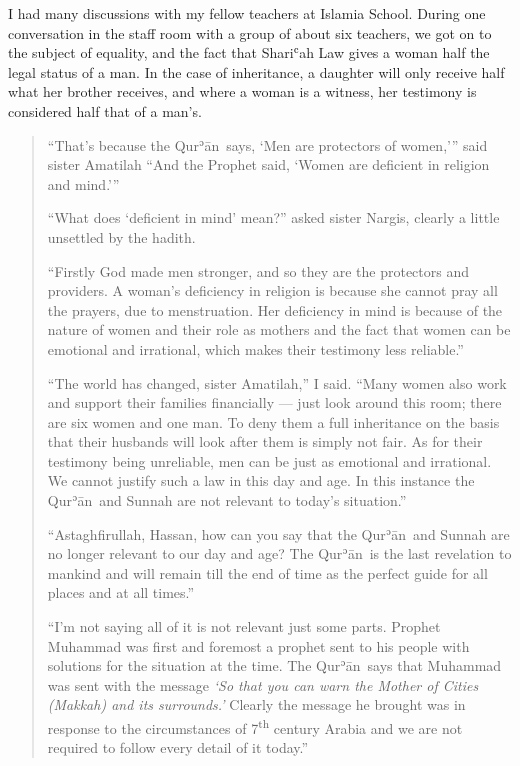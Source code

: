 \documentclass[12pt]{memoir}
\def\´{ʾ} %
\def\`{ʿ} %
\let \Sup=\textsuperscript
\newcommand{\cor}[2]{#2} %
\def \Quran{Qur\-\´ān} %
\begin{document}
I had many discussions with my fellow teachers at Islamia School.
During one conversation in the staff room with a group of about six teachers,
we got on to the subject of equality,
and the fact that Shari\`ah Law gives a woman half the legal status of a man.
In the case of inheritance, a daughter will only receive half
what her brother receives, and where a woman is a witness,
her testimony is considered half that of a man’s.

\begin{quote}
“That’s because the \Quran\ says, ‘Men are protectors of women,’”
said sister Amatilah
“And the Prophet said, ‘Women are deficient in religion and mind.’”

“What does ‘deficient in mind’ mean?” asked sister Nargis,
clearly a little unsettled by the hadith.

“Firstly God made men stronger, and so they are the protectors and providers.
A woman’s deficiency in religion is because
she cannot pray all the prayers, due to menstruation.
Her deficiency in mind is because of the nature of women and their role
as mothers and the fact that women can be emotional and irrational,
which makes their testimony less reliable.”

“The world has changed, sister Amatilah,” I said.
“Many women also work and support their families financially —
just look around this room; there are six women and one man.
To deny them a full inheritance on the basis that their husbands
will look after them is simply not fair.
As for their testimony being unreliable,
men can be just as emotional and irrational.
We cannot justify such a law in this day and age.
In this instance the \Quran\ and Sunnah
are not relevant to today’s situation.”

“Astaghfirullah, Hassan, how can you say that the \Quran\ and Sunnah
are no longer relevant to our day and age?
The \Quran\ is the last revelation to mankind and will remain
till the end of time as the perfect guide for all places and at all times.”

“I’m not saying all of it is not relevant just some parts.
Prophet Muhammad was first and foremost a prophet
sent to his people with solutions for the situation at the time.
The \Quran\ says that Muhammad was sent with the message
\emph{‘So that you can warn the Mother of Cities (Makkah)
and it\cor{’}{}s surrounds.’}
Clearly the message he brought was in response
to the circumstances of 7\Sup{th} century Arabia
and we are not required to follow every detail of it today.”


\end{quote}
\end{document}
